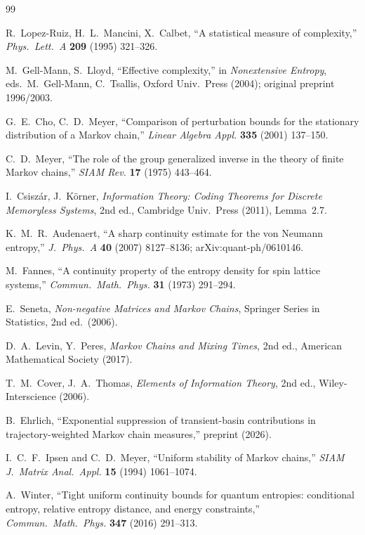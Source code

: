 \documentclass[11pt,a4paper]{article}
\begin{document}
\begin{thebibliography}{99}

R.~Lopez-Ruiz, H.~L.~Mancini, X.~Calbet,
``A statistical measure of complexity,''
\emph{Phys.\ Lett.\ A} \textbf{209} (1995) 321--326.

M.~Gell-Mann, S.~Lloyd,
``Effective complexity,''
in \emph{Nonextensive Entropy}, eds.\ M.~Gell-Mann, C.~Tsallis,
Oxford Univ.\ Press (2004); original preprint 1996/2003.

G.~E.~Cho, C.~D.~Meyer,
``Comparison of perturbation bounds for the stationary distribution
of a Markov chain,''
\emph{Linear Algebra Appl.} \textbf{335} (2001) 137--150.

C.~D.~Meyer,
``The role of the group generalized inverse in the theory of
finite Markov chains,''
\emph{SIAM Rev.} \textbf{17} (1975) 443--464.

I.~Csisz\'ar, J.~K\"orner,
\emph{Information Theory: Coding Theorems for Discrete Memoryless Systems},
2nd ed., Cambridge Univ.\ Press (2011), Lemma~2.7.

K.~M.~R.~Audenaert,
``A sharp continuity estimate for the von Neumann entropy,''
\emph{J.\ Phys.\ A} \textbf{40} (2007) 8127--8136;
arXiv:quant-ph/0610146.

M.~Fannes,
``A continuity property of the entropy density for spin lattice systems,''
\emph{Commun.\ Math.\ Phys.} \textbf{31} (1973) 291--294.

E.~Seneta,
\emph{Non-negative Matrices and Markov Chains},
Springer Series in Statistics, 2nd ed.\ (2006).

D.~A.~Levin, Y.~Peres,
\emph{Markov Chains and Mixing Times},
2nd ed., American Mathematical Society (2017).

T.~M.~Cover, J.~A.~Thomas,
\emph{Elements of Information Theory},
2nd ed., Wiley-Interscience (2006).

B.~Ehrlich,
``Exponential suppression of transient-basin contributions in trajectory-weighted Markov chain measures,''
preprint (2026).

I.~C.~F.~Ipsen and C.~D.~Meyer,
``Uniform stability of Markov chains,''
\emph{SIAM J.\ Matrix Anal.\ Appl.} \textbf{15} (1994) 1061--1074.

A.~Winter,
``Tight uniform continuity bounds for quantum entropies: conditional entropy, relative entropy distance, and energy constraints,''
\emph{Commun.\ Math.\ Phys.} \textbf{347} (2016) 291--313.

\end{thebibliography}
\end{document}

